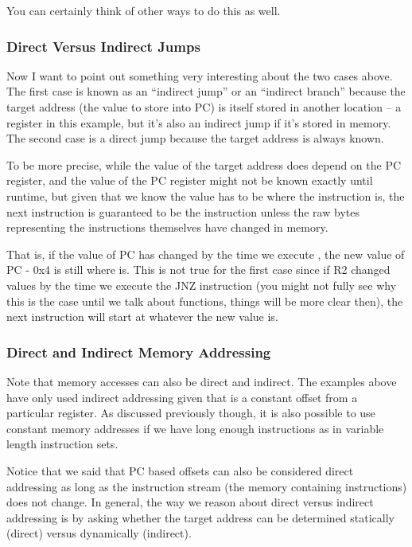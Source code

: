 You can certainly think of other ways to do this as well.

\subsubsection{Direct Versus Indirect Jumps}

Now I want to point out something very interesting about the two cases above. The first case is known as an “indirect jump” or an “indirect branch” because the target address (the value to store into PC) is itself stored in another location -- a register in this example, but it’s also an indirect jump if it’s stored in memory. The second case is a direct jump because the target address is always known. 

To be more precise, while the value of the target address does depend on the PC register, and the value of the PC register might not be known exactly until runtime, but given that we know the value has to be where the  instruction is, the next instruction is guaranteed to be the  instruction unless the raw bytes representing the instructions themselves have changed in memory. 

That is, if the value of PC has changed by the time we execute , the new value of PC - 0x4 is still where  is. This is not true for the first case since if R2 changed values by the time we execute the JNZ instruction (you might not fully see why this is the case until we talk about functions, things will be more clear then), the next instruction will start at whatever the new value is. 

\subsubsection{Direct and Indirect Memory Addressing}
Note that memory accesses can also be direct and indirect. The examples above have only used indirect addressing given that  is a constant offset from a particular register. As discussed previously though, it is also possible to use constant memory addresses if we have long enough instructions as in variable length instruction sets. 

Notice that we said that PC based offsets can also be considered direct addressing as long as the instruction stream (the memory containing instructions) does not change. In general, the way we reason about direct versus indirect addressing is by asking whether the target address can be determined statically (direct) versus dynamically (indirect).

